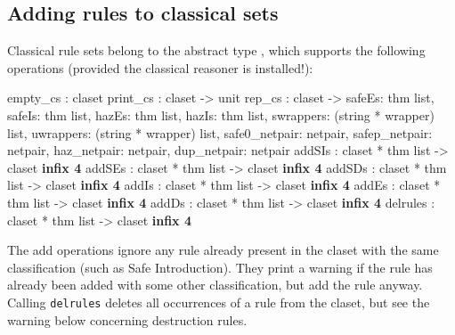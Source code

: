\subsection{Adding rules to classical sets}
Classical rule sets belong to the abstract type , which
supports the following operations (provided the classical reasoner is
installed!):
\begin{ttbox} 
empty_cs    : claset
print_cs    : claset -> unit
rep_cs      : claset -> {safeEs: thm list, safeIs: thm list,
                         hazEs: thm list,  hazIs: thm list, 
                         swrappers: (string * wrapper) list, 
                         uwrappers: (string * wrapper) list,
                         safe0_netpair: netpair, safep_netpair: netpair,
                           haz_netpair: netpair,   dup_netpair: netpair}
addSIs      : claset * thm list -> claset                 \hfill{\bf infix 4}
addSEs      : claset * thm list -> claset                 \hfill{\bf infix 4}
addSDs      : claset * thm list -> claset                 \hfill{\bf infix 4}
addIs       : claset * thm list -> claset                 \hfill{\bf infix 4}
addEs       : claset * thm list -> claset                 \hfill{\bf infix 4}
addDs       : claset * thm list -> claset                 \hfill{\bf infix 4}
delrules    : claset * thm list -> claset                 \hfill{\bf infix 4}
\end{ttbox}
The add operations ignore any rule already present in the claset with the same
classification (such as Safe Introduction).  They print a warning if the rule
has already been added with some other classification, but add the rule
anyway.  Calling \texttt{delrules} deletes all occurrences of a rule from the
claset, but see the warning below concerning destruction rules.
